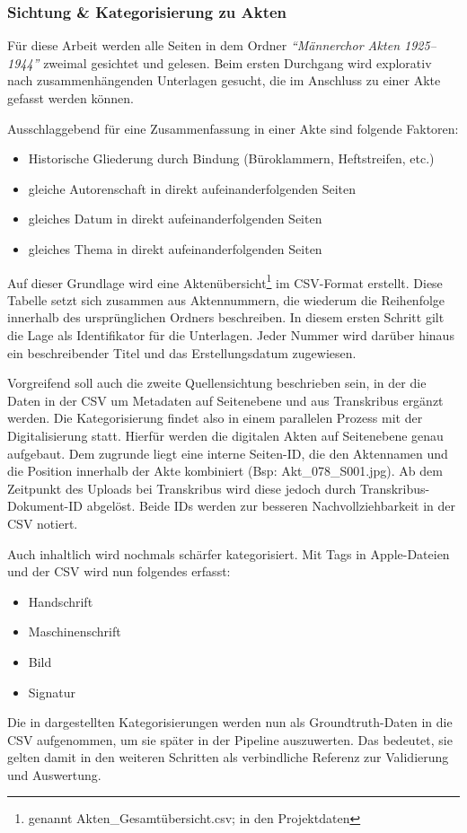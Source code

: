 \documentclass[12pt, a4paper, ngerman, bidi=default]{article}
\begin{document}
\subsubsection{Sichtung \& Kategorisierung zu Akten}
Für diese Arbeit werden alle Seiten in dem Ordner \textit{\enquote{Männerchor Akten 1925--1944}} 
zweimal gesichtet und gelesen. Beim ersten Durchgang wird explorativ nach zusammenhängenden Unterlagen gesucht, die im Anschluss zu einer Akte gefasst werden können.

Ausschlaggebend für eine Zusammenfassung in einer Akte sind folgende Faktoren:
\begin{itemize}
  \item Historische Gliederung durch Bindung (Büroklammern, Heftstreifen, etc.)
  \item gleiche Autorenschaft in direkt aufeinanderfolgenden Seiten
  \item gleiches Datum in direkt aufeinanderfolgenden Seiten
  \item gleiches Thema in direkt aufeinanderfolgenden Seiten
\end{itemize}
Auf dieser Grundlage wird eine Aktenübersicht\footnote{genannt Akten\_Gesamtübersicht.csv; in den Projektdaten} im CSV-Format erstellt. Diese Tabelle setzt sich zusammen aus Aktennummern, die wiederum die Reihenfolge innerhalb des ursprünglichen Ordners beschreiben. In diesem ersten Schritt gilt die Lage als 
Identifikator für die Unterlagen. Jeder Nummer wird darüber hinaus ein beschreibender Titel und das Erstellungsdatum zugewiesen.

Vorgreifend soll auch die zweite Quellensichtung beschrieben sein, in der die Daten in der CSV um Metadaten auf Seitenebene und aus Transkribus ergänzt werden. Die Kategorisierung findet also in einem parallelen Prozess mit der Digitalisierung statt.
Hierfür werden die digitalen Akten auf Seitenebene genau aufgebaut. Dem zugrunde liegt eine interne Seiten-ID, die den Aktennamen und die Position innerhalb der Akte kombiniert (Bsp: Akt\_078\_S001.jpg). 
Ab dem Zeitpunkt des Uploads bei Transkribus wird diese jedoch durch Transkribus-Dokument-ID abgelöst. Beide IDs werden zur besseren Nachvollziehbarkeit in der CSV notiert.

Auch inhaltlich wird nochmals schärfer kategorisiert. Mit Tags in Apple-Dateien und der CSV wird nun folgendes erfasst:
\begin{itemize}
  \item Handschrift
  \item Maschinenschrift
  \item Bild
  \item Signatur
\end{itemize}
Die in  dargestellten Kategorisierungen werden nun als Groundtruth-Daten in die CSV aufgenommen, um sie später in der Pipeline auszuwerten. Das bedeutet, sie gelten damit in den weiteren Schritten als verbindliche Referenz zur Validierung und Auswertung.
\end{document}

